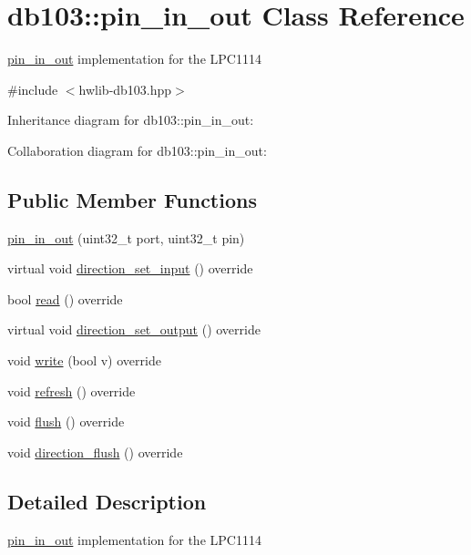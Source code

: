 \hypertarget{classdb103_1_1pin__in__out}{}\section{db103\+:\+:pin\+\_\+in\+\_\+out Class Reference}
\label{classdb103_1_1pin__in__out}


\hyperlink{classdb103_1_1pin__in__out}{pin\+\_\+in\+\_\+out} implementation for the L\+P\+C1114  




{\ttfamily \#include $<$hwlib-\/db103.\+hpp$>$}



Inheritance diagram for db103\+:\+:pin\+\_\+in\+\_\+out\+:


Collaboration diagram for db103\+:\+:pin\+\_\+in\+\_\+out\+:
\subsection*{Public Member Functions}
\begin{DoxyCompactItemize}
\item 
\hyperlink{classdb103_1_1pin__in__out_a0cffb6f1eb4b215902f500c96c4866c4}{pin\+\_\+in\+\_\+out} (uint32\+\_\+t port, uint32\+\_\+t pin)
\item 
virtual void \hyperlink{classdb103_1_1pin__in__out_af03a8c83335daf7c529a6a73fdfbf1b4}{direction\+\_\+set\+\_\+input} () override
\item 
bool \hyperlink{classdb103_1_1pin__in__out_a67a48a90485305275ce4573f5e371f6a}{read} () override
\item 
virtual void \hyperlink{classdb103_1_1pin__in__out_a55b94d79329ccbe2a263e954cccc1ba9}{direction\+\_\+set\+\_\+output} () override
\item 
void \hyperlink{classdb103_1_1pin__in__out_a45dcb3f770c432ece4374fcc428ee2e7}{write} (bool v) override
\item 
void \hyperlink{classdb103_1_1pin__in__out_a62907588942315bdfe8d467dadc22ed7}{refresh} () override
\item 
void \hyperlink{classdb103_1_1pin__in__out_a7cfd446e8a7c4453345ac3ec53d386ce}{flush} () override
\item 
void \hyperlink{classdb103_1_1pin__in__out_a9ec40785c38b923a6c5270e4435ad876}{direction\+\_\+flush} () override
\end{DoxyCompactItemize}


\subsection{Detailed Description}
\hyperlink{classdb103_1_1pin__in__out}{pin\+\_\+in\+\_\+out} implementation for the L\+P\+C1114 

